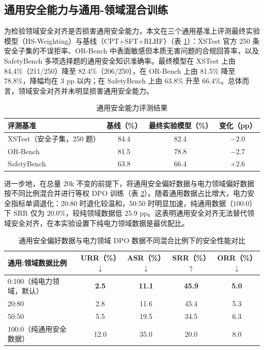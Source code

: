 \documentclass[fontset=fandol,type=master,campus=shenzhen,etitleauto=true]{hithesisbook}
\begin{document}
\subsection{通用安全能力与通用-领域混合训练}\label{general-safety-mixing}

为检验领域安全对齐是否损害通用安全能力，本文在三个通用基准上评测最终实验模型（HS-Weighting）与基线（CPT+SFT+RLHF）（表 \ref{tab:general-safety}）：XSTest\cite{ref49} 官方 250 条安全子集的不误拒率、OR-Bench\cite{ref50} 中表面敏感但本质无害问题的合规回答率，以及 SafetyBench\cite{ref87} 多项选择题的通用安全知识准确率。最终模型在 XSTest 上由 84.4\%（211/250）降至 82.4\%（206/250），在 OR-Bench 上由 81.5\% 降至 78.8\%，降幅均在 3 pp 以内；在 SafetyBench 上由 63.8\% 升至 66.4\%。总体而言，领域安全对齐并未明显损害通用安全能力。

\begin{table}[htbp]
\centering
\caption{通用安全能力评测结果}
\label{tab:general-safety}
\small
\renewcommand{\arraystretch}{1.15}
\begin{tabular}{l c c c}
\toprule
\textbf{评测基准} & \textbf{基线（\%）} & \textbf{最终实验模型（\%）} & \textbf{变化（pp）} \\
\midrule
XSTest（安全子集，250 题） & 84.4 & 82.4 & $-2.0$ \\
OR-Bench & 81.5 & 78.8 & $-2.7$ \\
SafetyBench & 63.8 & 66.4 & $+2.6$ \\
\bottomrule
\end{tabular}
\end{table}

进一步地，在总量 20k 不变的前提下，将通用安全偏好数据与电力领域偏好数据按不同比例混合并进行等权 DPO 训练（表 \ref{tab:domain-general-safety-mix}）。随着通用数据占比增大，电力安全指标单调退化：20:80 时退化较温和，50:50 时明显加速，纯通用数据（100:0）下 SRR 仅为 20.0\%，较纯领域数据低 25.9 pp。这表明通用安全对齐无法替代领域安全对齐，在本实验设置下纯电力领域数据是最优配比。

\begin{table}[htbp]
\centering
\caption{通用安全偏好数据与电力领域 DPO 数据不同混合比例下的安全性能对比}
\label{tab:domain-general-safety-mix}
\small
\setlength{\tabcolsep}{5pt}
\renewcommand{\arraystretch}{1.15}
\begin{tabular}{l c c c c}
\toprule
\textbf{通用:领域数据比例} & \textbf{URR（\%）$\downarrow$} & \textbf{ASR（\%）$\downarrow$} & \textbf{SRR（\%）$\uparrow$} & \textbf{ORR（\%）$\downarrow$} \\
\midrule
0:100（纯电力领域，默认） & \textbf{2.5} & \textbf{11.1} & \textbf{45.9} & \textbf{5.0} \\
20:80 & 2.8 & 11.6 & 45.4 & 5.3 \\
50:50 & 5.5 & 19.5 & 34.5 & 6.3 \\
100:0（纯通用安全数据） & 12.0 & 35.0 & 20.0 & 8.0 \\
\bottomrule
\end{tabular}
\end{table}
\end{document}

